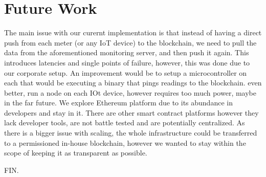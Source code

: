 \section{Future Work}
The main issue with our curernt implementation is that instead of having a direct push from each meter (or any IoT device) to the blockchain, we need to pull the data from the aforementioned monitoring server, and then push it again. This introduces latencies and single points of failure, however, this was done due to our corporate setup. An improvement would be to setup a microcontroller on each that would be executing a binary that pings readings to the blockchain. even better, run a node on each IOt device, however requires too much power, maybe in the far future. We explore Ethereum platform due to its abundance in developers and stay in it. There are other smart contract platforms however they lack developer tools, are not battle tested and are potentially centralized. As there is a bigger issue with scaling, the whole infrastructure could be transferred to a permissioned in-house blockchain, however we wanted to stay within the scope of keeping it as transparent as possible.

FIN.